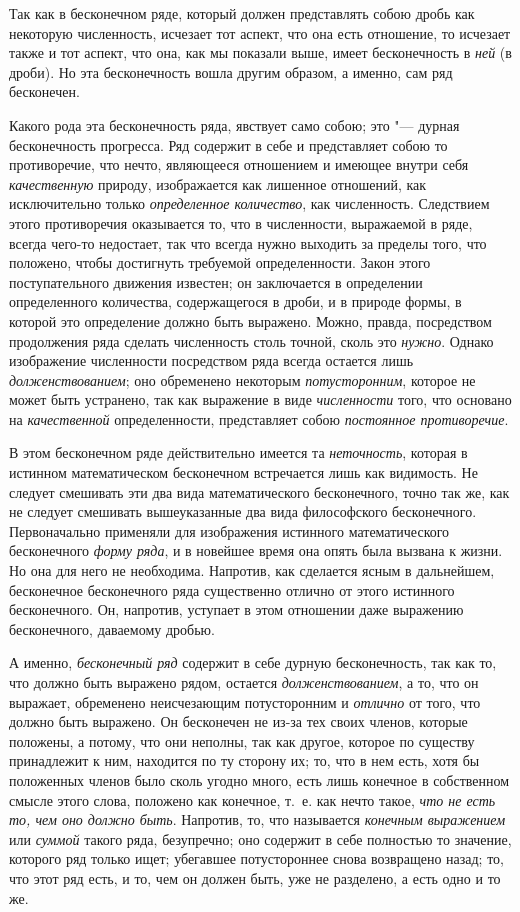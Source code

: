 Так как в бесконечном ряде, который должен представлять собою дробь как
некоторую численность, исчезает тот аспект, что она есть отношение, то
исчезает также и тот аспект, что она, как мы показали выше, имеет
бесконечность в {\em ней} (в дроби). Но эта
бесконечность вошла другим образом, а именно, сам ряд бесконечен.

Какого рода эта бесконечность ряда, явствует само собою; это "--- дурная
бесконечность прогресса. Ряд содержит в себе и представляет собою то
противоречие, что нечто, являющееся отношением и имеющее внутри себя
{\em качественную} природу, изображается как лишенное
отношений, как исключительно только {\em определенное
количество}, как численность. Следствием этого противоречия оказывается то,
что в численности, выражаемой в ряде, всегда чего-то недостает, так что
всегда нужно выходить за пределы того, что положено, чтобы достигнуть
требуемой определенности. Закон этого поступательного движения известен; он
заключается в определении определенного количества, содержащегося в дроби,
и в природе формы, в которой это определение должно быть выражено. Можно,
правда, посредством продолжения ряда сделать численность столь точной,
сколь это {\em нужно}. Однако изображение численности
посредством ряда всегда остается лишь
{\em долженствованием}; оно обременено некоторым
{\em потусторонним}, которое не может быть устранено,
так как выражение в виде {\em численности} того, что
основано на {\em качественной} определенности,
представляет собою {\em постоянное противоречие}.

\label{bkm:bm52a}В этом бесконечном ряде действительно имеется та
{\em неточность}, которая в истинном математическом
бесконечном встречается лишь как видимость. Не следует смешивать эти два
вида математического бесконечного, точно так же, как не следует смешивать
вышеуказанные два вида философского бесконечного. Первоначально применяли
для изображения истинного математического бесконечного
{\em форму ряда}, и в новейшее время она опять была
вызвана к жизни. Но она для него не необходима. Напротив, как сделается
ясным в дальнейшем, бесконечное бесконечного ряда существенно отлично от
этого истинного бесконечного. Он, напротив, уступает в этом отношении даже
выражению бесконечного, даваемому дробью.

А именно, {\em бесконечный ряд} содержит в себе дурную
бесконечность, так как то, что должно быть выражено рядом, остается
{\em долженствованием}, а то, что он выражает,
обременено неисчезающим потусторонним и {\em отлично}
от того, что должно быть выражено. Он бесконечен не из-за тех своих членов,
которые положены, а потому, что они неполны, так как другое, которое по
существу принадлежит к ним, находится по ту сторону их; то, что в нем есть,
хотя бы положенных членов было сколь угодно много, есть лишь конечное в
собственном смысле этого слова, положено как конечное, т.~е. как нечто
такое, {\em что не есть то, чем оно должно быть}.
Напротив, то, что называется {\em конечным выражением}
или {\em суммой} такого ряда, безупречно; оно содержит
в себе полностью то значение, которого ряд только ищет; убегавшее
потустороннее снова возвращено назад; то, что этот ряд есть, и то, чем он
должен быть, уже не разделено, а есть одно и то же.


